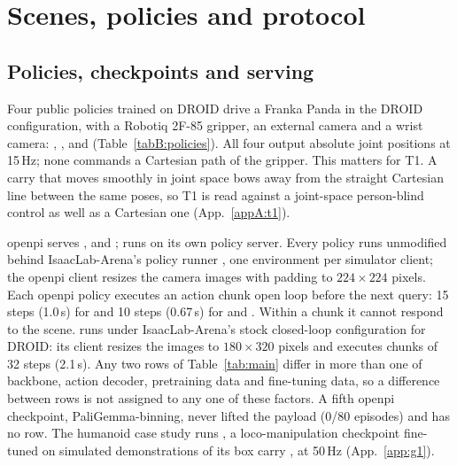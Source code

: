 \section{Scenes, policies and protocol}
\label{app:setup}

\subsection{Policies, checkpoints and serving}
\label{appB:policies}

Four public policies trained on DROID \citep{ref65} drive a Franka Panda in the DROID configuration, with a Robotiq 2F-85 gripper, an external camera and a wrist camera: \pifive{} \citep{ref63}, \pizero{} \citep{ref62}, \pifast{} \citep{ref64} and \grfull{} (Table~\ref{tabB:policies}). All four output absolute joint positions at 15\,Hz; none commands a Cartesian path of the gripper. This matters for T1. A carry that moves smoothly in joint space bows away from the straight Cartesian line between the same poses, so T1 is read against a joint-space person-blind control as well as a Cartesian one (App.~\ref{appA:t1}).

openpi \citep{ref67} serves \pifive{}, \pizero{} and \pifast{}; \grfull{} runs on its own policy server. Every policy runs unmodified behind IsaacLab-Arena's policy runner \citep{ref15}, one environment per simulator client; the openpi client resizes the camera images with padding to $224 \times 224$ pixels. Each openpi policy executes an action chunk open loop before the next query: 15 steps (1.0\,s) for \pifive{} and 10 steps (0.67\,s) for \pizero{} and \pifast{}. Within a chunk it cannot respond to the scene. \grfull{} runs under IsaacLab-Arena's stock closed-loop configuration for DROID: its client resizes the images to $180 \times 320$ pixels and executes chunks of 32 steps (2.1\,s). Any two rows of Table~\ref{tab:main} differ in more than one of backbone, action decoder, pretraining data and fine-tuning data, so a difference between rows is not assigned to any one of these factors. A fifth openpi checkpoint, PaliGemma-binning, never lifted the payload (0/80 episodes) and has no row. The humanoid case study runs \gone{}, a loco-manipulation checkpoint fine-tuned on simulated demonstrations of its box carry \citep{ref13}, at 50\,Hz (App.~\ref{app:g1}).

